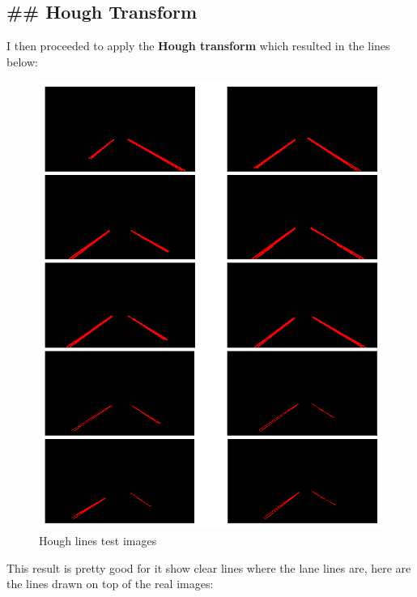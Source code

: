 \documentclass[11pt]{article}
\makeatletter
\def\maxwidth{\ifdim\Gin@nat@width>\linewidth\linewidth
    \else\Gin@nat@width\fi}
\let\Oldincludegraphics\includegraphics
\renewcommand{\includegraphics}[1]{\Oldincludegraphics[width=.8\maxwidth]{#1}}
\makeatother
\begin{document}
\hypertarget{hough-transform}{%
\subsection{\#\# Hough Transform}\label{hough-transform}}

I then proceeded to apply the \textbf{Hough transform} which resulted in
the lines below:

\begin{figure}
\centering
\includegraphics{test_images_output/hough_lines_test_images.png}
\caption{Hough lines test images}
\end{figure}

This result is pretty good for it show clear lines where the lane lines
are, here are the lines drawn on top of the real images:
\end{document}

